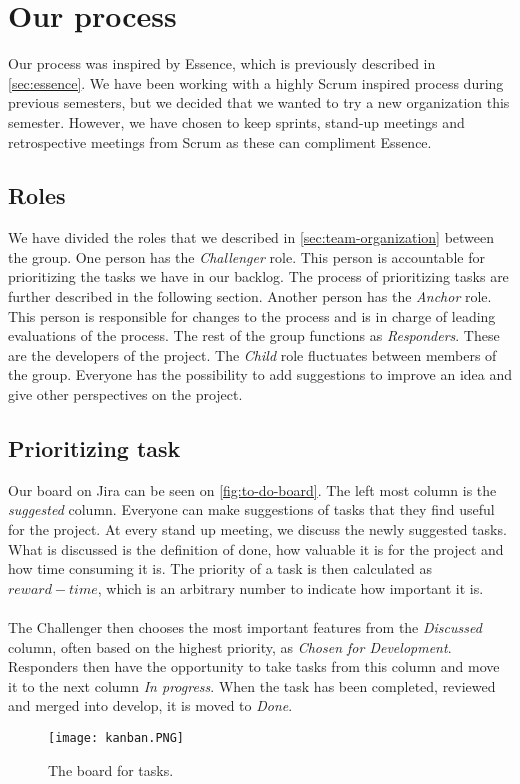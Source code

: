 \section{Our process}
Our process was inspired by Essence, which is previously described in \autoref{sec:essence}.
We have been working with a highly Scrum inspired process during previous semesters, but we decided that we wanted to try a new organization this semester.
However, we have chosen to keep sprints, stand-up meetings and retrospective meetings from Scrum as these can compliment Essence.

\subsection{Roles}
We have divided the roles that we described in \autoref{sec:team-organization} between the group.
One person has the \textit{Challenger} role.
This person is accountable for prioritizing the tasks we have in our backlog.
The process of prioritizing tasks are further described in the following section.
Another person has the \textit{Anchor} role.
This person is responsible for changes to the process and is in charge of leading evaluations of the process.
The rest of the group functions as \textit{Responders}.
These are the developers of the project.
The \textit{Child} role fluctuates between members of the group.
Everyone has the possibility to add suggestions to improve an idea and give other perspectives on the project.

\subsection{Prioritizing task}
Our board on Jira can be seen on \autoref{fig:to-do-board}.
The left most column is the \textit{suggested} column.
Everyone can make suggestions of tasks that they find useful for the project.
At every stand up meeting, we discuss the newly suggested tasks.
What is discussed is the definition of done, how valuable it is for the project and how time consuming it is.
The priority of a task is then calculated as $reward - time$, which is an arbitrary number to indicate how important it is.
\\\\
The Challenger then chooses the most important features from the \textit{Discussed} column, often based on the highest priority, as \textit{Chosen for Development}.
Responders then have the opportunity to take tasks from this column and move it to the next column \textit{In progress}.
When the task has been completed, reviewed and merged into develop, it is moved to \textit{Done}.
\begin{figure}[H]
    \centering
    \texttt{[image: kanban.PNG]}
    \caption{The board for tasks.}
    \label{fig:to-do-board}
\end{figure}

